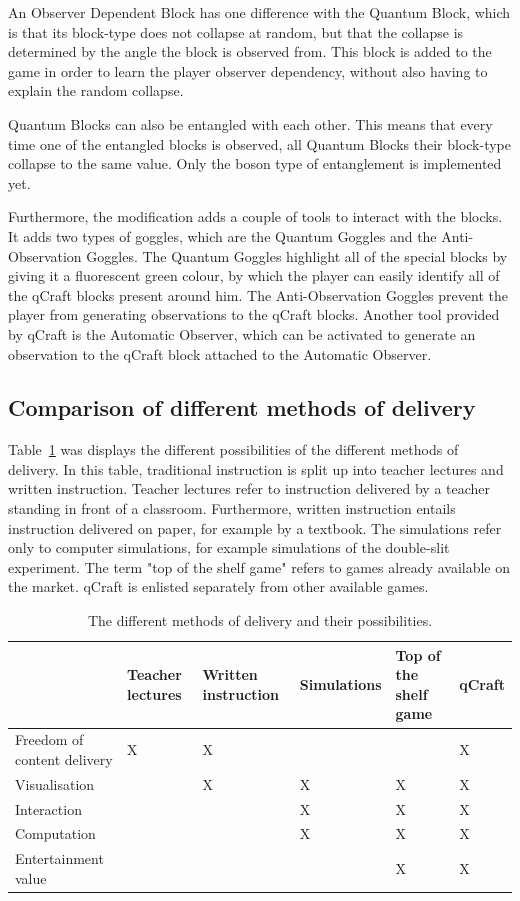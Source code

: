 \documentclass[11pt,twoside]{report} %
\begin{document}
An Observer Dependent Block has one difference with the Quantum Block, which is that its block-type does not collapse at random, but that the collapse is determined by the angle the block is observed from. This block is added to the game in order to learn the player observer dependency, without also having to explain the random collapse. 

Quantum Blocks can also be entangled with each other. This means that every time one of the entangled blocks is observed, all Quantum Blocks their block-type collapse to the same value. Only the boson type of entanglement is implemented yet.

Furthermore, the modification adds a couple of tools to interact with the blocks. It adds two types of goggles, which are the Quantum Goggles and the Anti-Observation Goggles. The Quantum Goggles highlight all of the special blocks by giving it a fluorescent green colour, by which the player can easily identify all of the qCraft blocks present around him. The Anti-Observation Goggles prevent the player from generating observations to the qCraft blocks. Another tool provided by qCraft is the Automatic Observer, which can be activated to generate an observation to the qCraft block attached to the Automatic Observer.

\subsection{Comparison of different methods of delivery}

Table~\ref{tab:comparisonsmedia} was displays the different possibilities of the different methods of delivery. In this table, traditional instruction is split up into teacher lectures and written instruction. Teacher lectures refer to instruction delivered by a teacher standing in front of a classroom. Furthermore, written instruction entails instruction delivered on paper, for example by a textbook. The simulations refer only to computer simulations, for example simulations of the double-slit experiment. The term "top of the shelf game" refers to games already available on the market. qCraft is enlisted separately from other available games.

\begin{table}[htbp]
\centering
\begin{tabular}{|p{3cm}|p{2cm}|p{2cm}|p{2cm}|p{2cm}|p{2cm}|}
\hline
 & Teacher lectures & Written instruction & Simulations & Top of the shelf game & qCraft \\ \hline
Freedom of content delivery & X & X &  &  & X \\ \hline

Visualisation &  & X & X & X & X \\ \hline
Interaction &  &  & X & X & X \\ \hline
Computation &  &  & X & X & X \\ \hline
Entertainment value & & & & X & X \\ \hline
\end{tabular}
\caption{The different methods of delivery and their possibilities.\label{tab:comparisonsmedia}}
\end{table}
\end{document}
